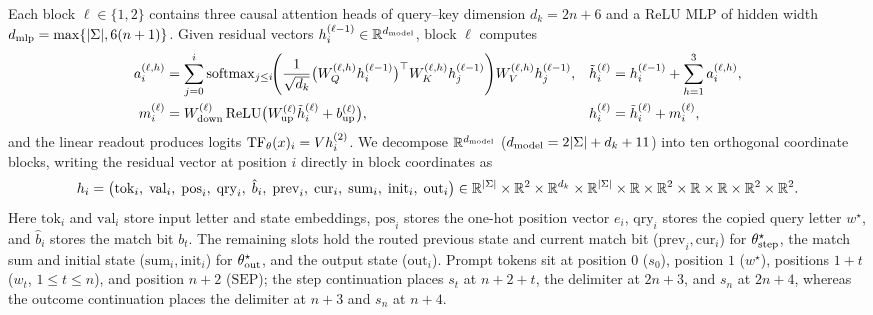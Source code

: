 Each block $\ell \in \{1,2\}$ contains three causal attention heads of query--key dimension $d_k = 2n + 6$ and a ReLU MLP of hidden width $d_{\mathrm{mlp}} = \max\{|\Sigma|, 6(n+1)\}$. Given residual vectors $h_i^{(\ell-1)} \in \mathbb R^{d_{\mathrm{model}}}$, block $\ell$ computes
\begin{align}
 a_i^{(\ell,h)} &= \sum_{j=0}^i \operatorname{softmax}_{j\le i}\!\Biggl(\frac{1}{\sqrt{d_k}}\bigl(W^{(\ell,h)}_Q h_i^{(\ell-1)}\bigr)^\top W^{(\ell,h)}_K h_j^{(\ell-1)}\Biggr)W^{(\ell,h)}_V h_j^{(\ell-1)}, &
 \tilde h_i^{(\ell)} &= h_i^{(\ell-1)} + \sum_{h=1}^3 a_i^{(\ell,h)}, \nonumber\\
 m_i^{(\ell)} &= W_{\mathrm{down}}^{(\ell)}\operatorname{ReLU}\bigl(W_{\mathrm{up}}^{(\ell)}\tilde h_i^{(\ell)} + b_{\mathrm{up}}^{(\ell)}\bigr), &
 h_i^{(\ell)} &= \tilde h_i^{(\ell)} + m_i^{(\ell)},
 \label{eq:block-Equations}
\end{align}
and the linear readout produces logits $\operatorname{TF}_\theta(x)_i = V h_i^{(2)}$. We decompose $\mathbb R^{d_{\mathrm{model}}}$ ($d_{\mathrm{model}} = 2|\Sigma| + d_k + 11$) into ten orthogonal coordinate blocks, writing the residual vector at position $i$ directly in block coordinates as
\[
 h_i
 = \bigl(\mathrm{tok}_i,\; \mathrm{val}_i,\; \mathrm{pos}_i,\; \mathrm{qry}_i,\; \hat b_i,\; \mathrm{prev}_i,\; \mathrm{cur}_i,\; \mathrm{sum}_i,\; \mathrm{init}_i,\; \mathrm{out}_i\bigr)
 \in \mathbb R^{|\Sigma|} \times \mathbb R^2 \times \mathbb R^{d_k} \times \mathbb R^{|\Sigma|} \times \mathbb R \times \mathbb R^2 \times \mathbb R \times \mathbb R \times \mathbb R^2 \times \mathbb R^2.
\]
Here $\mathrm{tok}_i$ and $\mathrm{val}_i$ store input letter and state embeddings, $\mathrm{pos}_i$ stores the one-hot position vector $e_i$, $\mathrm{qry}_i$ stores the copied query letter $w^\star$, and $\hat b_i$ stores the match bit $b_t$. The remaining slots hold the routed previous state and current match bit ($\mathrm{prev}_i, \mathrm{cur}_i$) for $\theta^\star_{\mathrm{step}}$, the match sum and initial state ($\mathrm{sum}_i, \mathrm{init}_i$) for $\theta^\star_{\mathrm{out}}$, and the output state ($\mathrm{out}_i$). Prompt tokens sit at position $0$ ($s_0$), position $1$ ($w^\star$), positions $1+t$ ($w_t$, $1\le t\le n$), and position $n+2$ ($\mathrm{SEP}$); the step continuation places $s_t$ at $n+2+t$, the delimiter at $2n+3$, and $s_n$ at $2n+4$, whereas the outcome continuation places the delimiter at $n+3$ and $s_n$ at $n+4$.

